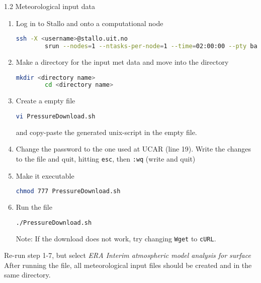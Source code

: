 \documentclass[xcolor=table]{beamer}
\begin{document}
\begin{frame}[fragile, allowframebreaks=1, t]{1.2 Meteorological input data}
\begin{enumerate}
	\item Log in to Stallo and onto a computational node
		\begin{lstlisting}[backgroundcolor = \color{light-gray}, language=bash]
		ssh -X <username>@stallo.uit.no
		srun --nodes=1 --ntasks-per-node=1 --time=02:00:00 --pty bash -i
		\end{lstlisting}
	\item Make a directory for the input met data and move into the directory
		\begin{lstlisting}[backgroundcolor = \color{light-gray}, language=bash]
		mkdir <directory name>
		cd <directory name>
		\end{lstlisting}
	\item Create a empty file
		\begin{lstlisting}[backgroundcolor = \color{light-gray}, language=bash]
		vi PressureDownload.sh 
		\end{lstlisting}
		and copy-paste the generated unix-script in the empty file. 
	\item Change the password to the one used at UCAR (line 19). Write the changes to the file and quit, hitting \texttt{esc}, then \texttt{:wq} (write and quit)
	\item Make it executable
		\begin{lstlisting}[backgroundcolor = \color{light-gray}, language=bash]
		chmod 777 PressureDownload.sh
		\end{lstlisting}
	\item Run the file
	\begin{lstlisting}[backgroundcolor = \color{light-gray}, language=bash]
	./PressureDownload.sh
	\end{lstlisting}
	Note: If the download does not work, try changing \texttt{Wget} to \texttt{cURL}.
\end{enumerate}
Re-run step 1-7, but select \textit{ERA Interim atmospheric model analysis for surface}
After running the file, all meteorological input files should be created and in the same directory. 
\end{frame}
\end{document}
